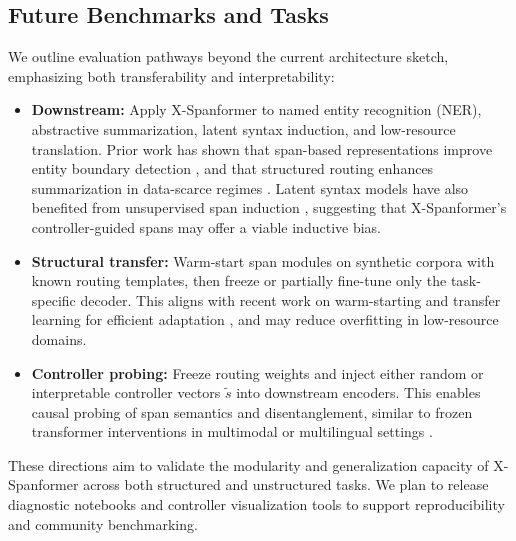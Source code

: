 \subsection{Future Benchmarks and Tasks}
\label{sec:future-tasks}

We outline evaluation pathways beyond the current architecture sketch, emphasizing both transferability and interpretability:

\begin{itemize}[leftmargin=1.5em]
  \item \textbf{Downstream:} Apply X-Spanformer to named entity recognition (NER), abstractive summarization, latent syntax induction, and low-resource translation. Prior work has shown that span-based representations improve entity boundary detection \cite{li2020unified}, and that structured routing enhances summarization in data-scarce regimes \cite{bajaj2021long, ziegler2024craft}. Latent syntax models have also benefited from unsupervised span induction \cite{kim2019unsupervised}, suggesting that X-Spanformer’s controller-guided spans may offer a viable inductive bias.
  
  \item \textbf{Structural transfer:} Warm-start span modules on synthetic corpora with known routing templates, then freeze or partially fine-tune only the task-specific decoder. This aligns with recent work on warm-starting and transfer learning for efficient adaptation \cite{dhole2025frozen, ziegler2024craft}, and may reduce overfitting in low-resource domains.

  \item \textbf{Controller probing:} Freeze routing weights and inject either random or interpretable controller vectors \(\tilde{s}\) into downstream encoders. This enables causal probing of span semantics and disentanglement, similar to frozen transformer interventions in multimodal or multilingual settings \cite{zhang2023frozen, dhole2025frozen}.
\end{itemize}

These directions aim to validate the modularity and generalization capacity of X-Spanformer across both structured and unstructured tasks. We plan to release diagnostic notebooks and controller visualization tools to support reproducibility and community benchmarking.
